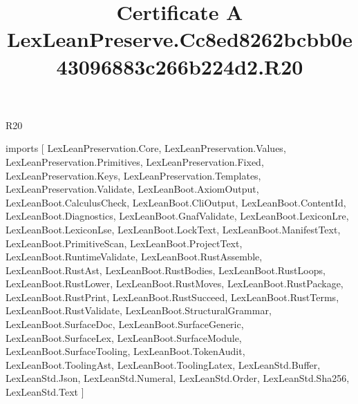 \begin{lexlean}{R20}
\title{Certificate A LexLeanPreserve.Cc8ed8262bcbb0e43096883c266b224d2.R20}
\begin{coremodule}
imports [
  LexLeanPreservation.Core,
  LexLeanPreservation.Values,
  LexLeanPreservation.Primitives,
  LexLeanPreservation.Fixed,
  LexLeanPreservation.Keys,
  LexLeanPreservation.Templates,
  LexLeanPreservation.Validate,
  LexLeanBoot.AxiomOutput,
  LexLeanBoot.CalculusCheck,
  LexLeanBoot.CliOutput,
  LexLeanBoot.ContentId,
  LexLeanBoot.Diagnostics,
  LexLeanBoot.GnafValidate,
  LexLeanBoot.LexiconLre,
  LexLeanBoot.LexiconLse,
  LexLeanBoot.LockText,
  LexLeanBoot.ManifestText,
  LexLeanBoot.PrimitiveScan,
  LexLeanBoot.ProjectText,
  LexLeanBoot.RuntimeValidate,
  LexLeanBoot.RustAssemble,
  LexLeanBoot.RustAst,
  LexLeanBoot.RustBodies,
  LexLeanBoot.RustLoops,
  LexLeanBoot.RustLower,
  LexLeanBoot.RustMoves,
  LexLeanBoot.RustPackage,
  LexLeanBoot.RustPrint,
  LexLeanBoot.RustSucceed,
  LexLeanBoot.RustTerms,
  LexLeanBoot.RustValidate,
  LexLeanBoot.StructuralGrammar,
  LexLeanBoot.SurfaceDoc,
  LexLeanBoot.SurfaceGeneric,
  LexLeanBoot.SurfaceLex,
  LexLeanBoot.SurfaceModule,
  LexLeanBoot.SurfaceTooling,
  LexLeanBoot.TokenAudit,
  LexLeanBoot.ToolingAst,
  LexLeanBoot.ToolingLatex,
  LexLeanStd.Buffer,
  LexLeanStd.Json,
  LexLeanStd.Numeral,
  LexLeanStd.Order,
  LexLeanStd.Sha256,
  LexLeanStd.Text
]


\end{coremodule}
\end{lexlean}
